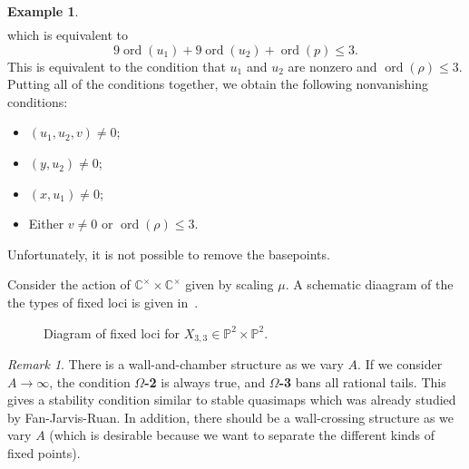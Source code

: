 \documentclass[10pt,oldfontcommands,oneside]{memoir}
\theoremstyle{definition}
\newtheorem{exm}[thm]{Example}
\theoremstyle{remark}
\newtheorem{rmk}[thm]{Remark}
\theoremstyle{plain}
\theoremstyle{definition}
\theoremstyle{remark}
\newcommand{\C}{\mathbb{C}}
\renewcommand{\P}{\mathbb{P}}
\newcommand{\mc}[1]{\mathcal{#1}}
\newcommand{\mr}[1]{\mathrm{#1}}
\newcommand{\on}[1]{\operatorname{#1}}
\newcommand{\1}{\mathbf{1}}
\newcommand{\2}{\mathbf{2}}
\newcommand{\3}{\mathbf{3}}
\begin{document}
\begin{exm}
\begin{align*}
    \end{align*}
    which is equivalent to
    \[ 9 \on{ord}(u_1) + 9 \on{ord}(u_2) + \on{ord}(p) \leq 3. \]
    This is equivalent to the condition that $u_1$ and $u_2$ are nonzero and $\on{ord}(\rho)\leq 3$. Putting all of the conditions together, we obtain the following nonvanishing conditions:
    \begin{itemize}
        \item $(u_1, u_2, v) \neq 0$;
        \item $(y, u_2) \neq 0$;
        \item $(x, u_1) \neq 0$;
        \item Either $v \neq 0$ or $\on{ord}(\rho) \leq 3$.
    \end{itemize}
    Unfortunately, it is not possible to remove the basepoints.

    Consider the action of $\C^{\times} \times \C^{\times}$ given by scaling $\mu$. A schematic diaagram of the the types of fixed loci is given in~.
    \begin{figure}[htpb]
    \begin{center}
    \end{center}
    \caption{Diagram of fixed loci for $X_{3,3} \in \P^2 \times \P^2$.}%
    \label{fig:p2p2loc}
    \end{figure}
\end{exm}

\begin{rmk}
    There is a wall-and-chamber structure as we vary $A$. If we consider $A \to \infty$, the condition \textbf{$\Omega$-2} is always true, and \textbf{$\Omega$-3} bans all rational tails. This gives a stability condition similar to stable quasimaps which was already studied by Fan-Jarvis-Ruan. In addition, there should be a wall-crossing structure as we vary $A$ (which is desirable because we want to separate the different kinds of fixed points).
\end{rmk}
\end{document}
